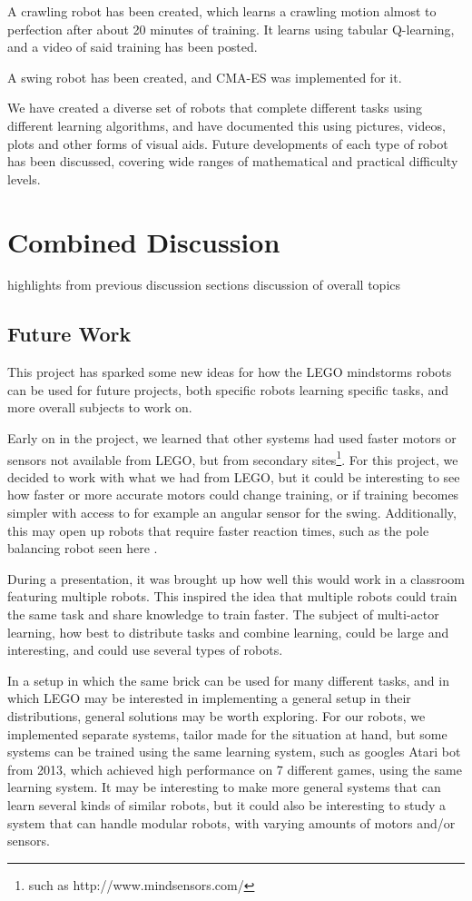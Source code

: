 \documentclass[11pt, a4paper]{article}
\begin{document}
A crawling robot has been created, which learns a crawling motion almost to perfection after about 20 minutes of training. It learns using tabular Q-learning, and a video of said training has been posted\cite{youtube_crawl_training}.

A swing robot has been created, and CMA-ES was implemented for it.

We have created a diverse set of robots that complete different tasks using different learning algorithms, and have documented this using pictures, videos, plots and other forms of visual aids. Future developments of each type of robot has been discussed, covering wide ranges of mathematical and practical difficulty levels.
\section{Combined Discussion}

highlights from previous discussion sections
discussion of overall topics
\subsection{Future Work}
This project has sparked some new ideas for how the LEGO mindstorms robots can be used for future projects, both specific robots learning specific tasks, and more overall subjects to work on.

Early on in the project, we learned that other systems had used faster motors or sensors not available from LEGO, but from secondary sites\footnote{such as http://www.mindsensors.com/}. For this project, we decided to work with what we had from LEGO, but it could be interesting to see how faster or more accurate motors could change training, or if training becomes simpler with access to for example an angular sensor for the swing. Additionally, this may open up robots that require faster reaction times, such as the pole balancing robot seen here \cite{youtube_pole}.

During a presentation, it was brought up how well this would work in a classroom featuring multiple robots. This inspired the idea that multiple robots could train the same task and share knowledge to train faster. The subject of multi-actor learning, how best to distribute tasks and combine learning, could be large and interesting, and could use several types of robots.

In a setup in which the same brick can be used for many different tasks, and in which LEGO may be interested in implementing a general setup in their distributions, general solutions may be worth exploring. For our robots, we implemented separate systems, tailor made for the situation at hand, but some systems can be trained using the same learning system, such as googles Atari bot from 2013, which achieved high performance on 7 different games, using the same learning system\cite{google_deepmind_atari}. It may be interesting to make more general systems that can learn several kinds of similar robots, but it could also be interesting to study a system that can handle modular robots, with varying amounts of motors and/or sensors.
\end{document}

